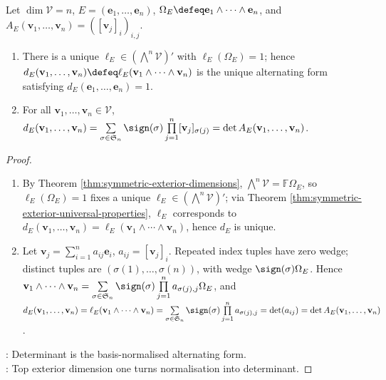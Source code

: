 \begin{corollary} \label{cor:determinant-from-exterior-universal-property} \\
Let $\dim\mathcal{V}=n$, $E=(\mathbf{e}_1,\ldots,\mathbf{e}_n)$, $\Omega_E\defeq\mathbf{e}_1\wedge\cdots\wedge\mathbf{e}_n$, and $A_E(\mathbf{v}_1,\ldots,\mathbf{v}_n)=([\mathbf{v}_j]_i)_{i,j}$.
\begin{enumerate}[label=(\roman*)]
\setlength{\itemsep}{0pt}
\item There is a unique $\ell_E\in(\bigwedge^n\mathcal{V})'$ with $\ell_E(\Omega_E)=1$; hence $d_E(\mathbf{v}_1,\ldots,\mathbf{v}_n)\defeq\ell_E(\mathbf{v}_1\wedge\cdots\wedge\mathbf{v}_n)$ is the unique alternating form satisfying $d_E(\mathbf{e}_1,\ldots,\mathbf{e}_n)=1$.
\item For all $\mathbf{v}_1,\ldots,\mathbf{v}_n\in\mathcal{V}$, $d_E(\mathbf{v}_1,\ldots,\mathbf{v}_n) =\sum\limits_{\sigma\in\mathfrak{S}_n}\sign(\sigma)\prod\limits_{j=1}^{n}[\mathbf{v}_j]_{\sigma(j)} =\det A_E(\mathbf{v}_1,\ldots,\mathbf{v}_n)$.
\end{enumerate}
\begin{proof}
\begin{enumerate}[label=(\roman*)]
\setlength{\itemsep}{0pt}
\item By Theorem \ref{thm:symmetric-exterior-dimensions}, $\bigwedge^n\mathcal{V}=\mathbb{F}\Omega_E$, so $\ell_E(\Omega_E)=1$ fixes a unique $\ell_E\in(\bigwedge^n\mathcal{V})'$; via Theorem \ref{thm:symmetric-exterior-universal-properties}, $\ell_E$ corresponds to $d_E(\mathbf{v}_1,\ldots,\mathbf{v}_n)=\ell_E(\mathbf{v}_1\wedge\cdots\wedge\mathbf{v}_n)$, hence $d_E$ is unique.
\item Let $\mathbf{v}_j=\sum_{i=1}^{n}a_{ij}\mathbf{e}_i$, $a_{ij}=[\mathbf{v}_j]_i$. Repeated index tuples have zero wedge; distinct tuples are $(\sigma(1),\ldots,\sigma(n))$, with wedge $\sign(\sigma)\Omega_E$. Hence $\mathbf{v}_1\wedge\cdots\wedge\mathbf{v}_n =\sum\limits_{\sigma\in\mathfrak{S}_n}\sign(\sigma)\prod\limits_{j=1}^{n}a_{\sigma(j),j}\Omega_E$, and\\
$d_E(\mathbf{v}_1,\ldots,\mathbf{v}_n) =\ell_E(\mathbf{v}_1\wedge\cdots\wedge\mathbf{v}_n) =\sum\limits_{\sigma\in\mathfrak{S}_n}\sign(\sigma)\prod\limits_{j=1}^{n}a_{\sigma(j),j}\\ =\det(a_{ij}) =\det A_E(\mathbf{v}_1,\ldots,\mathbf{v}_n)$.
\end{enumerate}
: Determinant is the basis-normalised alternating form.\\
: Top exterior dimension one turns normalisation into determinant.
\end{proof}
\end{corollary}

